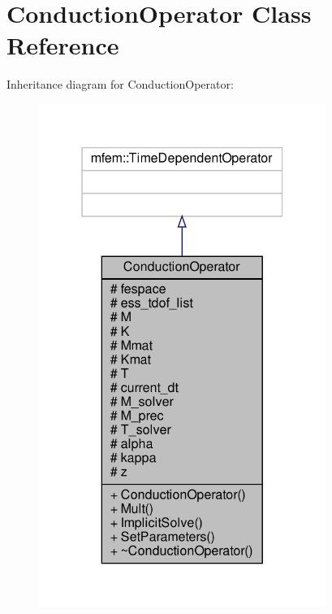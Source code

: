 \hypertarget{classConductionOperator}{}\section{Conduction\+Operator Class Reference}
\label{classConductionOperator}


Inheritance diagram for Conduction\+Operator\+:\nopagebreak
\begin{figure}[H]
\begin{center}
\leavevmode
\includegraphics[width=265pt]{classConductionOperator__inherit__graph}
\end{center}
\end{figure}


